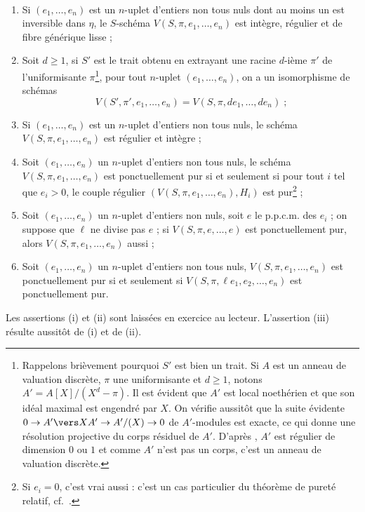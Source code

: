\documentclass[10pt]{../fichiers-configuration-latex/smfart}
\begin{document}
\begin{lemme2}~

\begin{enumerate}
\item[(i)] Si $(e_1,\dots,e_n)$ est un $n$-uplet d'entiers non tous nuls
dont au moins un est inversible dans $\eta$, le $S$-schéma
$V(S,\pi,e_1,\dots,e_n)$ est intègre, régulier et de fibre générique
lisse ;
\item[(ii)] Soit $d\geq 1$, si $S'$ est le trait obtenu en
extrayant une racine $d$-ième $\pi'$
de l'uniformisante $\pi$\;\footnote{Rappelons brièvement pourquoi $S'$ est
bien un trait. Si $A$ est un anneau de valuation discrète, $\pi$ une
uniformisante et $d\geq 1$, notons $A'=A[X]/(X^d-\pi)$. Il est évident que
$A'$ est local noethérien et que son idéal maximal est
engendré par $X$. On vérifie aussitôt que la
suite évidente $0\to A'\vers X A' \to A'/(X) \to 0$ de $A'$-modules est
exacte, ce qui donne une résolution projective du corps résiduel de $A'$.
D'après \cite[§D.1, chapitre~IV]{Algebre@Serre},
$A'$ est régulier de dimension
$0$ ou $1$ et comme $A'$ n'est pas un corps, c'est un anneau de valuation
discrète.},
pour tout $n$-uplet $(e_1,\dots,e_n)$, on a un
isomorphisme de schémas
\[V(S',\pi',e_1,\dots,e_n)=V(S,\pi,de_1,\dots,de_n)\;\text{;}\]
\item[(iii)] Si $(e_1,\dots,e_n)$ est un $n$-uplet d'entiers non tous nuls,
le schéma $V(S,\pi,e_1,\dots,e_n)$ est régulier et intègre ;
\item[(iv)] Soit $(e_1,\dots,e_n)$ un $n$-uplet d'entiers non tous nuls,
le schéma $V(S,\pi,e_1,\dots,e_n)$ est ponctuellement pur si et seulement si
pour tout $i$ tel que $e_i>0$, le couple régulier
$(V(S,\pi,e_1,\dots,e_n),H_i)$ est pur\;\footnote{Si
$e_i=0$, c'est vrai aussi : c'est un cas particulier du théorème de pureté
relatif, cf.~.} ;
\item[(v)] Soit $(e_1,\dots,e_n)$ un $n$-uplet d'entiers non nuls,
soit $e$ le p.p.c.m. des $e_i$ ;
on suppose que $\ell$ ne divise pas $e$ ; si
$V(S,\pi,e,\dots,e)$ est
ponctuellement pur, alors $V(S,\pi,e_1,\dots,e_n)$ aussi ;
\item[(vi)] Soit $(e_1,\dots,e_n)$ un $n$-uplet d'entiers non tous nuls,
$V(S,\pi,e_1,\dots,e_n)$ est ponctuellement pur si et seulement si
$V(S,\pi,\ell e_1,e_2,\dots,e_n)$ est ponctuellement pur.
\end{enumerate}
\end{lemme2}

Les assertions (i) et (ii) sont laissées en exercice au lecteur.
L'assertion (iii) résulte aussitôt de (i) et de (ii).
\end{document}
